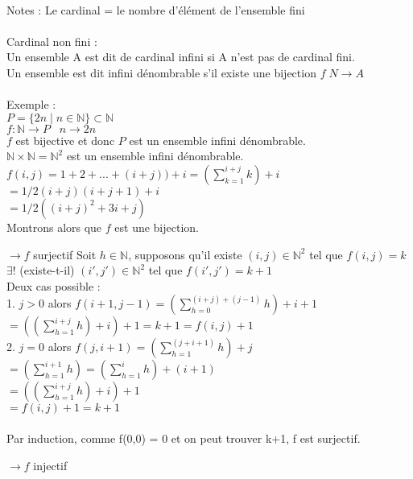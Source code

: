 \documentclass[12pt]{report}
\begin{document}
\paragraph{}
Notes : Le cardinal = le nombre d'élément de l'ensemble fini\\
\paragraph{}
Cardinal non fini :\\
Un ensemble A est dit de cardinal infini si A n'est pas de cardinal fini.\\
Un ensemble est dit infini dénombrable s'il existe une bijection $f\; N \to A$\\

\paragraph{}
Exemple :\\
$P = \{2n\;|\;n \in \mathbb{N}\} \subset \mathbb{N}$\\
$f : \mathbb{N}\to P\;\;\;n\to 2n$\\
$f$ est bijective et donc $P$ est un ensemble infini dénombrable.\\$\mathbb{N} \times \mathbb{N} = \mathbb{N}^2$ est un ensemble infini dénombrable.\\
$f(i,j)=1+2+...+(i+j))+i= (\sum_{k=1}^{i+j}k)+i $\\$= 1/2 (i+j)(i+j+1)+i $\\$=1/2 ((i+j)^2+3i+j)$\\
Montrons alors que $f$ est une bijection.

$\to f$ surjectif
Soit $h \in \mathbb{N}$, supposons qu'il existe $(i,j) \in \mathbb{N}^2$ tel que $f(i,j) = k$\\
$\exists!$ (existe-t-il) $(i',j') \in \mathbb{N}^2$ tel que $f(i',j')=k+1$\\
Deux cas possible :\\

1. $j>0$ alors $f(i+1,j-1)=(\sum_{h=0}^{(i+j)+(j-1)}h)+i+1$\\
$=((\sum_{h=1}^{i+j}h)+i)+1 = k+1 = f(i,j)+1$\\
2. $j=0$ alors $f(j,i+1)=(\sum_{h=1}^{(j+i+1)}h)+j$\\
$=(\sum_{h=1}^{i+1}h) = (\sum_{h=1}^{i}h)+(i+1)$\\
$=((\sum_{h=1}^{i+j}h)+i)+1$\\
$=f(i,j)+1 = k+1$\\
\paragraph{}
Par induction, comme f(0,0) = 0 et on peut trouver k+1, f est surjectif.

$\to f$ injectif
\end{document}
